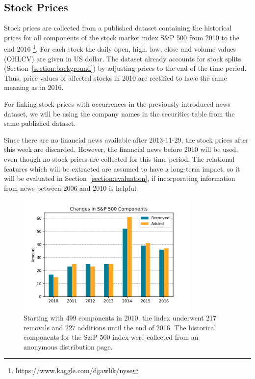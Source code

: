\subsection{Stock Prices}
Stock prices are collected from a published dataset containing the historical prices for all components of the stock market index S\&P 500 from 2010 to the end 2016 \footnote{https://www.kaggle.com/dgawlik/nyse}. For each stock the daily open, high, low, close and volume values (OHLCV) are given in US dollar. The dataset already accounts for stock splits (Section~\ref{section:background}) by adjusting prices to the end of the time period. Thus, price values of affected stocks in 2010 are rectified to have the same meaning as in 2016.

For linking stock prices with occurrences in the previously introduced news dataset, we will be using the company names in the securities table from the same published dataset.

Since there are no financial news available after 2013-11-29, the stock prices after this week are discarded. However, the financial news before 2010 will be used, even though no stock prices are collected for this time period. The relational features which will be extracted are assumed to have a long-term impact, so it will be evaluated in Section~\ref{section:evaluation}, if incorporating information from news between 2006 and 2010 is helpful.

\begin{figure}[!ht]
    \centering
    \includegraphics[width=0.8\textwidth]{figures/data/sp500-comp-changes.pdf}
    \caption{Starting with 499 components in 2010, the index underwent 217 removals and 227 additions until the end of 2016. The historical components for the S\&P 500 index were collected from an anonymous distribution page. \protect\footnotemark}
    \label{fig:sp500_changes}
\end{figure}

